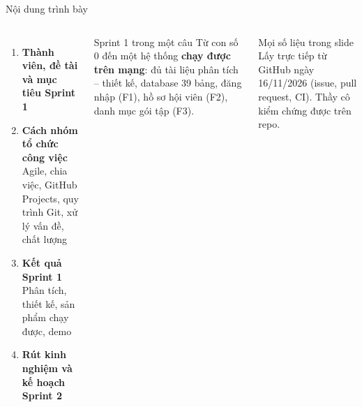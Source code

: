 \documentclass[t, aspectratio=169]{beamer}
\newcommand{\num}[1]{{\color{hustprimary}\bfseries #1}}
\begin{document}
\begin{frame}{Nội dung trình bày}
\vspace{6pt}
\begin{columns}[T,onlytextwidth]
\begin{enumerate}\setlength{\itemsep}{9pt}
  \item[\num{1}] \textbf{Thành viên, đề tài và mục tiêu Sprint 1}
  \item[\num{2}] \textbf{Cách nhóm tổ chức công việc}\\
    {\small\color{muted}Agile, chia việc, GitHub Projects, quy trình Git, xử lý vấn đề, chất lượng}
  \item[\num{3}] \textbf{Kết quả Sprint 1}\\
    {\small\color{muted}Phân tích, thiết kế, sản phẩm chạy được, demo}
  \item[\num{4}] \textbf{Rút kinh nghiệm và kế hoạch Sprint 2}
\end{enumerate}
\begin{block}{Sprint 1 trong một câu}
\small Từ con số 0 đến một hệ thống \textbf{chạy được trên mạng}: đủ tài liệu phân tích – thiết kế, database 39 bảng, đăng nhập (F1), hồ sơ hội viên (F2), danh mục gói tập (F3).
\end{block}
\vspace{6pt}
\begin{block}{Mọi số liệu trong slide}
\small Lấy trực tiếp từ GitHub ngày 16/11/2026 (issue, pull request, CI). Thầy cô kiểm chứng được trên repo.
\end{block}
\end{columns}
\end{frame}

\end{document}
